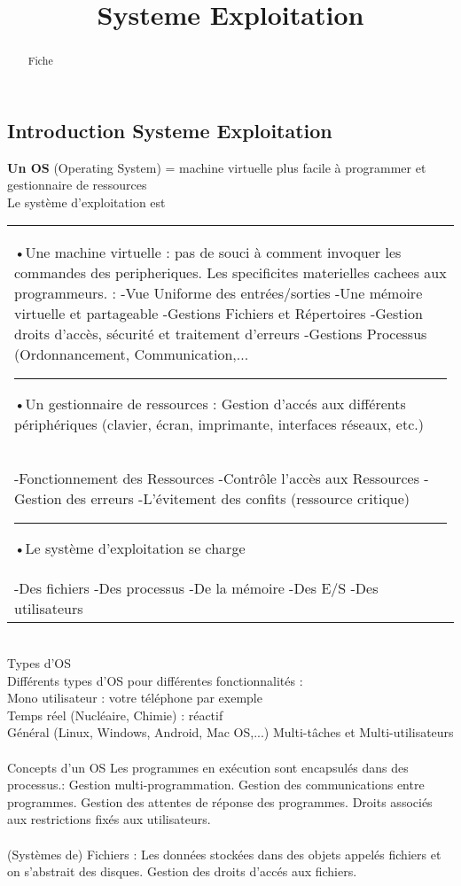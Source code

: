 \documentclass[5pt]{article}
\begin{document}
\begin{scriptsize}
\title{Systeme Exploitation}
\date{}
\begin{abstract}
Fiche
\end{abstract}
\subsection{Introduction Systeme Exploitation}
\textbf{Un OS} (Operating System) = machine virtuelle plus facile à programmer et gestionnaire de ressources\\
Le système d’exploitation est\\
\begin{tabularx}{\linewidth}{|Y|}
\hline
•Une machine virtuelle : pas de souci à comment invoquer les commandes des peripheriques. Les specificites materielles cachees aux programmeurs. : -Vue Uniforme des entrées/sorties -Une mémoire virtuelle et partageable -Gestions Fichiers et Répertoires -Gestion droits d’accès, sécurité et traitement d’erreurs -Gestions Processus (Ordonnancement, Communication,...
\hrule\noindent
•Un gestionnaire de ressources : Gestion d’accés aux différents périphériques (clavier, écran, imprimante, interfaces réseaux, etc.)\\
-Fonctionnement des Ressources -Contrôle l’accès aux Ressources -Gestion des erreurs -L’évitement des confits (ressource critique)
\hrule\noindent
•Le système d’exploitation se charge\\
-Des fichiers -Des processus -De la mémoire -Des E/S -Des utilisateurs
\\ \hline
\end{tabularx}\\
Types d’OS\\
Différents types d’OS pour différentes fonctionnalités :\\
Mono utilisateur : votre téléphone par exemple\\
Temps réel (Nucléaire, Chimie) : réactif\\
Général (Linux, Windows, Android, Mac OS,...) Multi-tâches et Multi-utilisateurs\\
\\
Concepts d’un OS Les programmes en exécution sont encapsulés dans des processus.: Gestion multi-programmation. Gestion des communications entre programmes. Gestion des attentes de réponse des programmes. Droits associés aux restrictions fixés aux utilisateurs.\\
\\
(Systèmes de) Fichiers : Les données stockées dans des objets appelés fichiers et on s’abstrait des disques. Gestion des droits d’accés aux fichiers.\\

\end{scriptsize}
\end{document}
